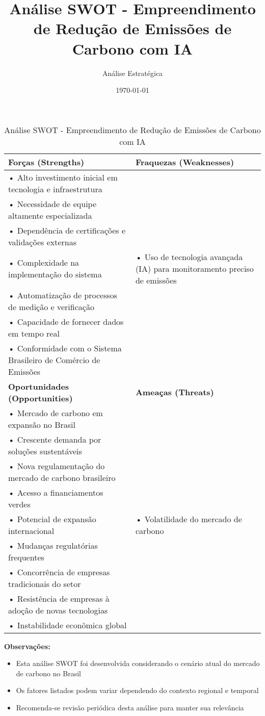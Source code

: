 \documentclass[12pt,a4paper]{article}
\begin{document}
\title{Análise SWOT - Empreendimento de Redução de Emissões de Carbono com IA}
\author{Análise Estratégica}
\date{\today}
\maketitle
\begin{table}[h]
    \centering
    \begin{tabular}{|p{}|p{}|}
    \hline
    \textbf{Forças (Strengths)} & \textbf{Fraquezas (Weaknesses)} \\
    \hline
    • Alto investimento inicial em tecnologia e infraestrutura \\
    • Necessidade de equipe altamente especializada \\
    • Dependência de certificações e validações externas \\
    • Complexidade na implementação do sistema
    &
    • Uso de tecnologia avançada (IA) para monitoramento preciso de emissões \\
    • Automatização de processos de medição e verificação \\
    • Capacidade de fornecer dados em tempo real \\
    • Conformidade com o Sistema Brasileiro de Comércio de Emissões \\
    \hline
    \textbf{Oportunidades (Opportunities)} & \textbf{Ameaças (Threats)} \\
    \hline
    • Mercado de carbono em expansão no Brasil \\
    • Crescente demanda por soluções sustentáveis \\
    • Nova regulamentação do mercado de carbono brasileiro \\
    • Acesso a financiamentos verdes \\
    • Potencial de expansão internacional
    &
    • Volatilidade do mercado de carbono \\
    • Mudanças regulatórias frequentes \\
    • Concorrência de empresas tradicionais do setor \\
    • Resistência de empresas à adoção de novas tecnologias \\
    • Instabilidade econômica global \\
    \hline
    \end{tabular}
    \caption{Análise SWOT - Empreendimento de Redução de Emissões de Carbono com IA}
    \label{tab:swot}
    \end{table}
\vspace{1cm}
\textbf{Observações:}
\begin{itemize}
\item Esta análise SWOT foi desenvolvida considerando o cenário atual do mercado de carbono no Brasil
\item Os fatores listados podem variar dependendo do contexto regional e temporal
\item Recomenda-se revisão periódica desta análise para manter sua relevância
\end{itemize}
\end{document}
